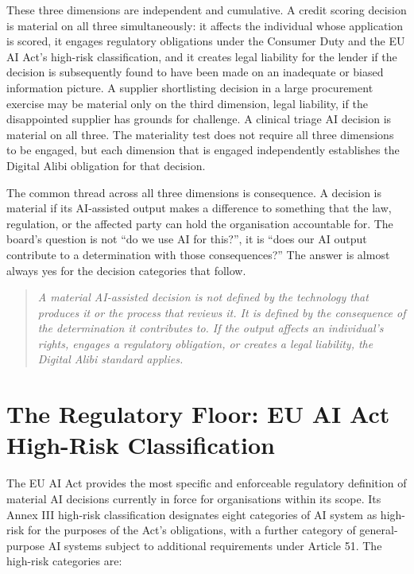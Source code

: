 These three dimensions are independent and cumulative. A credit scoring decision is material on all three simultaneously: it affects the individual whose application is scored, it engages regulatory obligations under the Consumer Duty and the EU AI Act's high-risk classification, and it creates legal liability for the lender if the decision is subsequently found to have been made on an inadequate or biased information picture. A supplier shortlisting decision in a large procurement exercise may be material only on the third dimension, legal liability, if the disappointed supplier has grounds for challenge. A clinical triage AI decision is material on all three. The materiality test does not require all three dimensions to be engaged, but each dimension that is engaged independently establishes the Digital Alibi obligation for that decision.

The common thread across all three dimensions is consequence. A decision is material if its AI-assisted output makes a difference to something that the law, regulation, or the affected party can hold the organisation accountable for. The board's question is not ``do we use AI for this?'', it is ``does our AI output contribute to a determination with those consequences?'' The answer is almost always yes for the decision categories that follow.

\begin{quote}
\emph{A material AI-assisted decision is not defined by the technology that produces it or the process that reviews it. It is defined by the consequence of the determination it contributes to. If the output affects an individual's rights, engages a regulatory obligation, or creates a legal liability, the Digital Alibi standard applies.}
\end{quote}

\scenebreak

\section{The Regulatory Floor: EU AI Act High-Risk Classification}

The EU AI Act provides the most specific and enforceable regulatory definition of material AI decisions currently in force for organisations within its scope. Its Annex III high-risk classification designates eight categories of AI system as high-risk for the purposes of the Act's obligations, with a further category of general-purpose AI systems subject to additional requirements under Article 51. The high-risk categories are:


